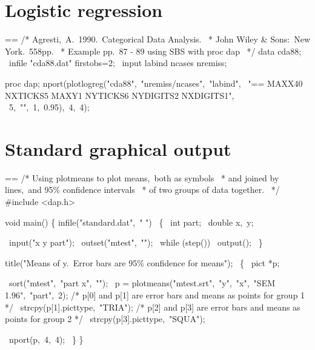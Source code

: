 \documentclass{book}
\makeatletter
\newenvironment{Texinfopreformatted}{%
  \par\GNUTobeylines\obeyspaces\frenchspacing\parskip=\z@\parindent=\z@}{}
{\catcode`\^^M=13 \gdef\GNUTobeylines{\catcode`\^^M=13 \def^^M{\null\par}}}
\newenvironment{Texinfoindented}{\begin{list}{}{}\item\relax}{\end{list}}
\renewcommand{\_}{\Texinfounderscore\discretionary{}{}{}}
\makeatother
\begin{document}
\section{{Logistic regression}}
\label{anchor:Logistic-regression-examples}%
%
%

\begin{Texinfoindented}
\begin{Texinfopreformatted}%
\ttfamily /* Agresti,\ A.\  1990.\  Categorical Data Analysis.
\ * John Wiley \& Sons:\ New York.\  558pp.
\ * Example pp.\ 87 - 89 using SBS with proc dap
\ */
data cda88;
\  infile "cda88.dat" firstobs=2;
\  input labind ncases nremiss;

proc dap;
nport(plotlogreg("cda88",\ "nremiss/ncases",\ "labind",
\                 "== MAXX40 NXTICKS5 MAXY1 NYTICKS6 NYDIGITS2 NXDIGITS1",
\                 5,\ "",\ 1,\ 0.95),\ 4,\ 4);


\end{Texinfopreformatted}
\end{Texinfoindented}

\section{{Standard graphical output}}
\label{anchor:Standard-graphical-output}%

\begin{Texinfoindented}
\begin{Texinfopreformatted}%
\ttfamily /* Using plotmeans to plot means,\ both as symbols
\ * and joined by lines,\ and 95\% confidence intervals
\ * of two groups of data together.
\ */
\#include <dap.h>

void main()
\{
infile("standard.dat",\ " ")
\  \{
\    int part;
\    double x,\ y;

\    input("x y part");
\    outset("mtest",\ "");
\    while (step())
\      output();
\  \}

title("Means of y.\ Error bars are 95\% confidence for means");
\  \{
\    pict *p;

\    sort("mtest",\ "part x",\ "");
\    p = plotmeans("mtest.srt",\ "y",\ "x",\ "SEM 1.96",\ "part",\ 2);
/* p[0] and p[1] are error bars and means as points for group 1 */
\    strcpy(p[1].pict\_type,\ "TRIA");
/* p[2] and p[3] are error bars and means as points for group 2 */
\    strcpy(p[3].pict\_type,\ "SQUA");

\    nport(p,\ 4,\ 4);
\  \}
\}
\end{Texinfopreformatted}
\end{Texinfoindented}
\end{document}
